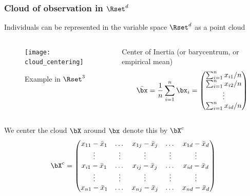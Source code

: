 \documentclass{beamer}\usepackage[]{graphicx}\usepackage[]{color}
\begin{document}
\begin{frame}
  \frametitle{Cloud of observation in $\Rset^d$}

  Individuals can be represented in the \alert{variable space $\Rset^d$} as a point cloud

  \begin{columns}
    \begin{column}{.5\textwidth}
      \begin{figure}      
      \texttt{[image: cloud\_centering]}
      \vspace{-.25cm}
      \caption{Example in $\Rset^3$}
      \end{figure}      
    \end{column}

  \begin{column}{.5\textwidth}
    \begin{block}{Center of Inertia}
      (or barycentrum, or empirical mean)
      \[ \bar{\bx} = \frac{1}{n} \sum _{i=1}^n \bx_i = 
      \begin{pmatrix}
        \sum _{i=1}^n x_{i1}/n \\
        \sum _{i=1}^n x_{i2}/n \\
        \vdots\\
        \sum _{i=1}^n x_{id} /n
      \end{pmatrix}
      \]
    \end{block}
  \end{column}
  \end{columns}

  We center the cloud $\bX$ around $\bx$ denote this by $\bX^c$
  \begin{equation*}
    \bX^c = \begin{pmatrix}
    x_{11} - \bar{x}_1 &   \dots & x_{1j}  - \bar{x}_j & \dots  & x_{1d} - \bar{x}_d   \cr
              \vdots   &  \vdots & \vdots              & \vdots & \vdots  \cr
    x_{i1} - \bar{x}_1 &   \dots & x_{ij} - \bar{x}_j  & \dots  & x_{id}  - \bar{x}_d \cr
              \vdots   &  \vdots & \vdots              & \vdots & \vdots  \cr
    x_{n1} - \bar{x}_1 &  \dots  & x_{nj} - \bar{x}_j  & \dots  & x_{nd}  - \bar{x}_d \cr
    \end{pmatrix}
  \end{equation*}

\end{frame}
\end{document}
